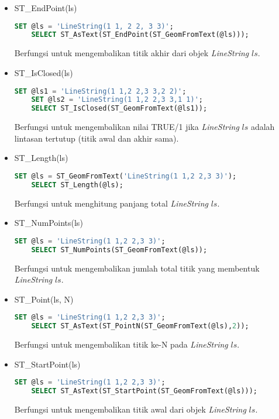 \begin{itemize}
    \item ST\_EndPoint(ls)
    \begin{lstlisting}[language=SQL]
    SET @ls = 'LineString(1 1, 2 2, 3 3)';
    SELECT ST_AsText(ST_EndPoint(ST_GeomFromText(@ls)));
    \end{lstlisting}
    Berfungsi untuk mengembalikan titik akhir dari objek \textit{LineString} $ls$.
    \newpage
    \item ST\_IsClosed(ls)
    \begin{lstlisting}[language=SQL]
    SET @ls1 = 'LineString(1 1,2 2,3 3,2 2)';
    SET @ls2 = 'LineString(1 1,2 2,3 3,1 1)';
    SELECT ST_IsClosed(ST_GeomFromText(@ls1));
    \end{lstlisting}
    Berfungsi untuk mengembalikan nilai TRUE/1 jika \textit{LineString} $ls$ adalah lintasan tertutup (titik awal dan akhir sama).
    \item ST\_Length(ls)
    \begin{lstlisting}[language=SQL]
    SET @ls = ST_GeomFromText('LineString(1 1,2 2,3 3)');
    SELECT ST_Length(@ls);
    \end{lstlisting}
    Berfungsi untuk menghitung panjang total \textit{LineString} $ls$.
    \item ST\_NumPoints(ls)
    \begin{lstlisting}[language=SQL]
    SET @ls = 'LineString(1 1,2 2,3 3)';
    SELECT ST_NumPoints(ST_GeomFromText(@ls));
    \end{lstlisting}
    Berfungsi untuk mengembalikan jumlah total titik yang membentuk \textit{LineString} $ls$.
    \item ST\_Point(ls, N)
    \begin{lstlisting}[language=SQL]
    SET @ls = 'LineString(1 1,2 2,3 3)';
    SELECT ST_AsText(ST_PointN(ST_GeomFromText(@ls),2));
    \end{lstlisting}
    Berfungsi untuk mengembalikan titik ke-N pada \textit{LineString} $ls$.
    \item ST\_StartPoint(ls)
    \begin{lstlisting}[language=SQL]
    SET @ls = 'LineString(1 1,2 2,3 3)';
    SELECT ST_AsText(ST_StartPoint(ST_GeomFromText(@ls)));
    \end{lstlisting}
    Berfungsi untuk mengembalikan titik awal dari objek \textit{LineString} $ls$.
    
\end{itemize}

